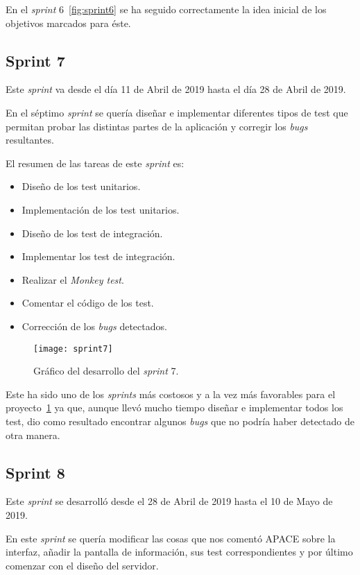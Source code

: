 En el \textit{sprint} 6~\ref{fig:sprint6} se ha seguido correctamente la idea inicial de los objetivos marcados para éste.

\subsection{Sprint 7}
Este \textit{sprint} va desde el día 11 de Abril de 2019 hasta el día 28 de Abril de 2019.

En el séptimo \textit{sprint} se quería diseñar e implementar diferentes tipos de test que permitan probar las distintas partes de la aplicación y corregir los \textit{bugs} resultantes.

El resumen de las tareas de este \textit{sprint} es:
\begin{itemize}
	\item Diseño de los test unitarios.
	\item Implementación de los test unitarios.
	\item Diseño de los test de integración.
	\item Implementar los test de integración.
	\item Realizar el \textit{Monkey test}.
	\item Comentar el código de los test.
	\item Corrección de los \textit{bugs} detectados.
\end{itemize}

\begin{figure}
	\centering
	\texttt{[image: sprint7]}
	\caption{Gráfico del desarrollo del \textit{sprint} 7.}
	\label{fig:sprint7}
\end{figure}

Este ha sido uno de los \textit{sprints} más costosos y a la vez más favorables para el proyecto~\ref{fig:sprint7} ya que, aunque llevó mucho tiempo diseñar e implementar todos los test, dio como resultado encontrar algunos \textit{bugs} que no podría haber detectado de otra manera.

\subsection{Sprint 8}
Este \textit{sprint} se desarrolló desde el 28 de Abril de 2019 hasta el 10 de Mayo de 2019.

En este \textit{sprint} se quería modificar las cosas que nos comentó APACE sobre la interfaz, añadir la pantalla de información, sus test correspondientes y por último comenzar con el diseño del servidor.

